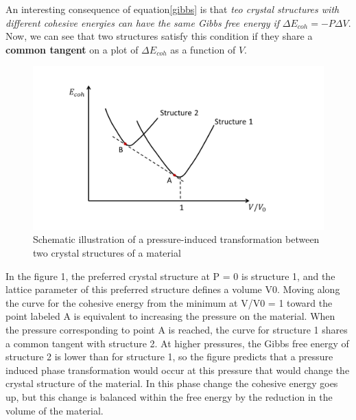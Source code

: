 \documentclass[12pt]{article}
\begin{document}
An interesting consequence of equation\ref{gibbs} is that \emph{teo crystal structures with different cohesive energies can have the same Gibbs free energy if }$\Delta E_{coh}=-P\Delta V$. Now, we can see that two structures satisfy this condition if they share a \textbf{common tangent }on a plot of $\Delta E_{coh}$ as a function of $V$.
\begin{figure}[h]
\caption{Schematic illustration of a pressure-induced transformation between two crystal
structures of a material}
\includegraphics[width=\textwidth]{pic01.png}
\end{figure}

In the figure 1, the preferred crystal structure at P = 0 is structure 1, and the lattice parameter of this preferred structure defines a volume V0. Moving along the curve for the cohesive energy from the minimum at V/V0 = 1 toward the point labeled A is equivalent to increasing the pressure on the material. When the pressure corresponding to point A is reached, the curve for structure 1 shares a common tangent with structure 2. At higher pressures, the Gibbs free energy of structure 2 is lower than for structure 1, so the figure predicts that a pressure induced phase transformation would occur at this pressure that would change the crystal structure of the material. In this phase change the cohesive energy goes up, but this change is balanced within the free energy by the reduction in the volume of the material.
\end{document}
